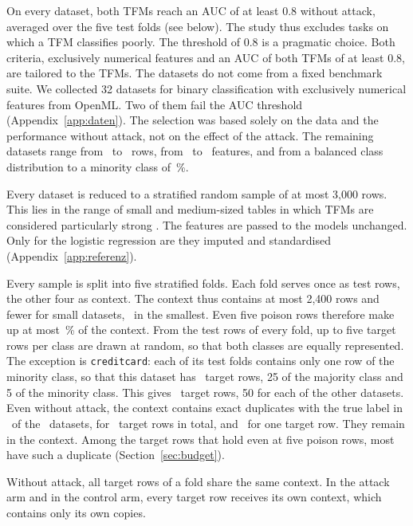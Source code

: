 \documentclass[pdflatex,sn-mathphys-num]{sn-jnl}
\begin{document}
On every dataset, both TFMs reach an AUC of at least 0.8 without attack,
averaged over the five test folds (see below). The study thus excludes
tasks on which a TFM classifies poorly. The threshold
of 0.8 is a pragmatic choice. Both criteria, exclusively numerical features and an
AUC of both TFMs of at least 0.8, are tailored to the TFMs. The datasets
do not come from a fixed benchmark suite. We collected 32 datasets for binary
classification with exclusively numerical features from OpenML. Two of them fail the AUC threshold
(Appendix~\ref{app:daten}). The selection was based solely on the data
and the performance without attack, not on the effect of the attack. The
remaining datasets range from \zRowsMin\ to \zRowsMax\ rows, from
\zFeatMin\ to \zFeatMax\ features, and from a balanced class
distribution to a minority class of \zMinorityMinPct\,\%.

Every dataset is reduced to a stratified random sample of at most 3,000
rows. This lies in the range of small and medium-sized tables in which
TFMs are considered particularly strong \citep{hollmann2025,
erickson2025}. The features are passed to the models unchanged. Only for
the logistic regression are they imputed and standardised
(Appendix~\ref{app:referenz}).

Every sample is split into five stratified folds. Each fold serves once
as test rows, the other four as context. The context thus contains at
most 2,400 rows and fewer for small datasets, \zCtxMin\ in the smallest.
Even five poison rows therefore make up at most \zGiftAnteilMax\,\% of
the context. From the test rows of every fold, up to five target rows
per class are drawn at random, so that both classes are equally
represented. The exception is \texttt{creditcard}: each of its test
folds contains only one row of the minority class, so that this dataset
has \zCreditZiele\ target rows, 25 of the majority class and 5 of the
minority class. This gives \zZiele\ target rows, 50 for each of the
other datasets. Even without attack, the context contains exact
duplicates with the true label in \zDupDS\ of the \zDS\ datasets, for
\zDupZiele\ target rows in total, and \zDupMax\ for one target row. They
remain in the context. Among the target rows that hold even at five
poison rows, most have such a duplicate (Section~\ref{sec:budget}).

Without attack, all target rows of a fold share the same context. In the
attack arm and in the control arm, every target row receives its own
context, which contains only its own copies.
\end{document}
